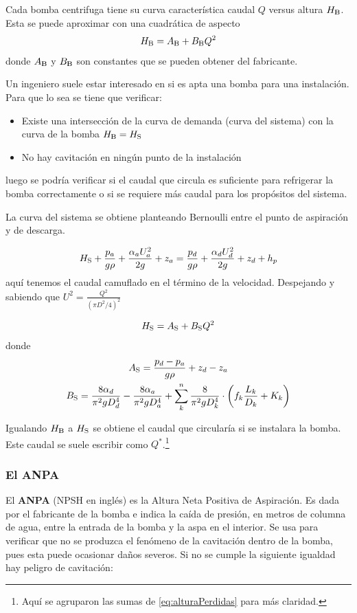 Cada bomba centrifuga tiene su curva característica caudal $Q$ versus altura $H_{\RM{B}}$. Esta se puede aproximar con una cuadrática de aspecto
\begin{equation}
    H_{\RM{B}} = A_{\RM{B}}+B_{\RM{B}} Q^2
\end{equation}
donde $A_{\RM{B}}$ y $B_{\RM{B}}$ son constantes que se pueden obtener del fabricante.

Un ingeniero suele estar interesado en si es apta una bomba para una instalación. Para que lo sea se tiene que verificar:
\begin{itemize}
    \item Existe una intersección de la curva de demanda (curva del sistema) con la curva de la bomba $H_{\RM{B}} = H_{\RM{S}}$
    \item No hay cavitación en ningún punto de la instalación
\end{itemize}
luego se podría verificar si el caudal que circula es suficiente para refrigerar la bomba correctamente o si se requiere más caudal para los propósitos del sistema.

La curva del sistema se obtiene planteando Bernoulli entre el punto de aspiración y de descarga.

\[
H_{\RM{S}}+\frac{p_a}{g\rho}+\frac{\alpha_aU_a^2}{2g}+z_a =\frac{p_d}{g\rho}+\frac{\alpha_d U_d^2}{2g}+z_d+h_p
\]
aquí tenemos el caudal camuflado en el término de la velocidad. Despejando y sabiendo que $U^2=\frac{Q^2}{(\pi D^2/4)^2}$

\begin{equation}
H_{\RM{S}} = A_{\RM{S}}+B_{\RM{S}}Q^2
\end{equation}
donde
\begin{gather*}
A_{\RM{S}} = \frac{p_d-p_a}{g\rho}+z_d-z_a \\
B_{\RM{S}} = \frac{8\alpha_d}{\pi^2gD_d^4}-\frac{8\alpha_a}{\pi^2gD_a^4}+\sum_k^n\frac{8}{\pi^2gD_k^4}\cdot\left(f_k\frac{L_k}{D_k}+K_k \right)
\end{gather*}
\newcommand{\Qstar}{{Q^{*}}}

Igualando $H_{\RM{B}}$ a $H_{\RM{S}}$ se obtiene el caudal que circularía si se instalara la bomba. Este caudal se suele escribir como $\Qstar$.\footnote{Aquí se agruparon las sumas de \eqref{eq:alturaPerdidas} para más claridad.}

\subsubsection*{El ANPA}
El \textbf{ANPA} (NPSH en inglés) es la Altura Neta Positiva de Aspiración. Es dada por el fabricante de la bomba e indica la caída de presión, en metros de columna de agua, entre la entrada de la bomba y la aspa en el interior. Se usa para verificar que no se produzca el fenómeno de la cavitación dentro de la bomba, pues esta puede ocasionar daños severos. Si no se cumple la siguiente igualdad hay peligro de cavitación:


